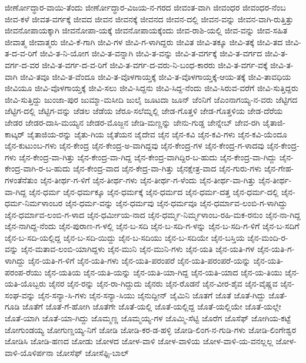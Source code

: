 ಜೀರ್ಣೋದ್ಧಾರ-ವಾಯಿ-ತೆಂದು
ಜೀರ್ಣೋದ್ಧಾರ-ವಿಜಯ-ನ-ಗರದ
ಜೀವಂತ-ವಾಗಿ
ಜೀವಂಧರ
ಜೀವಂಧರ-ನೆಂಬ
ಜೀವ-ಕಳೆ
ಜೀವತ-ವರ್ಗಕ್ಕೆ
ಜೀವದ
ಜೀವನ
ಜೀವನಕ್ಕೆ
ಜೀವನದ
ಜೀವನ-ದಲ್ಲಿ
ಜೀವನ-ವನ್ನು
ಜೀವನ-ವಾಗಿ-ರುತ್ತಿತ್ತು
ಜೀವನೋಪಾಯಕ್ಕಾಗಿ
ಜೀವನೋಪಾ-ಯಕ್ಕೆ
ಜೀವನೋಪಾಯಕ್ಕೆಂದು
ಜೀವ-ರಾಶಿ-ಯಲ್ಲಿ
ಜೀವ-ವನ್ನು
ಜೀವ-ಸಹಿತ
ಜೀವಾತ್ಮ
ಜೀವಾತ್ಮರು
ಜೀವಿ-ಕೆ-ಗಾಗಿ
ಜೀವಿ-ಗಳ
ಜೀವಿ-ಗ-ಳಾಗಿದ್ದರು
ಜೀವಿತ
ಜೀವಿ-ತಕ್ಕೂ
ಜೀವಿ-ತಕ್ಕೆ
ಜೀವಿ-ತದ
ಜೀವಿ-ತ-ದ-ವ-ರಿಗೆ
ಜೀವಿ-ತ-ನಿ-ಯೋಗ
ಜೀವಿ-ತ-ವನ್ನಾಗಿ
ಜೀವಿ-ತ-ವನ್ನು
ಜೀವಿ-ತ-ವರ್ಗಕ್ಕೆ
ಜೀವಿ-ತ-ವರ್ಗದ
ಜೀವಿ-ತ-ವರ್ಗ-ದ-ವರ
ಜೀವಿ-ತ-ವರ್ಗ-ದ-ವ-ರಿಗೆ
ಜೀವಿ-ತ-ವರ್ಗ-ದ-ವರು-ನಿ-ಬಂಧ-ಕಾರರು
ಜೀವಿ-ತ-ವರ್ಗ-ವಕ್ಕೆ
ಜೀವಿ-ತ-ವಾಗಿ
ಜೀವಿ-ತವೂ
ಜೀವಿ-ತ-ವೆಂದೂ
ಜೀವಿ-ತ-ವೊಳಗಾಯ್ತಕ್ಕೆ
ಜೀವಿ-ತ-ವೊಳಗಾಯ್ತಕ್ಕೆ-ಆಯ-ತಕ್ಕೆ
ಜೀವಿ-ತಾವಧಿಯ
ಜೀವಿಯೂ
ಜೀವಿ-ವೊಳಗಾಯ್ತಕ್ಕೆ
ಜೀವಿ-ಸಲು
ಜೀವಿ-ಸಿದ್ದನು
ಜೀವಿ-ಸಿದ್ದ-ನೆಂದು
ಜೀವಿ-ಸಿರುವ-ವರೆಗೆ
ಜೀವಿ-ಸುತ್ತಿದ್ದರು
ಜೀವಿ-ಸುತ್ತಿದ್ದು
ಜುಂಜಾ-ಪುರ
ಜುಮ್ಮಾ-ಮಸೀದಿ
ಜುಲೈ
ಜೂಟದಾ
ಜೂನ್
ಜೆಂನಿಗೆ
ಜೆಎಂನಾಗಯ್ಯ-ನ-ವರು
ಜೆಟ್ಟಿಗದ
ಜೆಟ್ಟಿಗ-ದಲ್ಲಿ
ಜೆಟ್ಟಿಗ-ವನ್ನು
ಜೆಡಲ
ಜೆಡೆಯ
ಜೆರೂ-ಸಲೆಮ್ನಲ್ಲಿ
ಜೇಡ-ಗೊತ್ತಳಿ
ಜೇಡ-ಗೊತ್ತಳಿಯ
ಜೇಡ-ದೆರೆಯ
ಜೇಡರ
ಜೇಡರ-ದಾಸಿ-ಮಯ್ಯನ
ಜೇಡರ-ಮೊಜ್ಜನ
ಜೇಡಿ-ಮಣ್ಣನ್ನು
ಜೇನು-ಗುಡ್ಡ
ಜೇನ್ನೇಬ್
ಜೇವ-ರಗಿ
ಜೈತಾಜಿ-ಕಾಟ್ಕರ್
ಜೈತಾಜಿಯ-ರನ್ನು
ಜೈತು-ಗಿಯ
ಜೈತೆಯನ
ಜೈದೇವ
ಜೈನ
ಜೈನ-ಕವಿ
ಜೈನ-ಕವಿ-ಗಳು
ಜೈನ-ಕವಿ-ಯೆಂದೂ
ಜೈನ-ಕುಟುಂಬ-ಗಳು
ಜೈನ-ಕೇಂದ್ರ
ಜೈನ-ಕೇಂದ್ರ-ಅ-ವಾಗಿದ್ದವು
ಜೈನ-ಕೇಂದ್ರ-ಗಳ
ಜೈನ-ಕೇಂದ್ರ-ಗ-ಳಾದವು
ಜೈನ-ಕೇಂದ್ರ-ಗಳು
ಜೈನ-ಕೇಂದ್ರ-ವಾ-ಗಿತ್ತು
ಜೈನ-ಕೇಂದ್ರ-ವಾ-ಗಿದ್ದ
ಜೈನ-ಕೇಂದ್ರ-ವಾಗಿದ್ದಿರ-ಬ-ಹುದು
ಜೈನ-ಕೇಂದ್ರ-ವಾ-ಗಿದ್ದು
ಜೈನ-ಕೇಂದ್ರ-ವಾಗಿ-ರ-ಬ-ಹುದು
ಜೈನ-ಕೇಂದ್ರ-ವಾದ
ಜೈನ-ಕೇದ್ರ-ವಾ-ಗಿತ್ತು
ಜೈನಕ್ಷೇತ್ರ-ವಾದ
ಜೈನ-ಗುರು-ಗಳು
ಜೈನ-ಗೇಹ-ಗಳಂತೆನೆತುಂ
ಜೈನ-ತೀರ್ಥ-ಗ-ಳಿಗೆ
ಜೈನ-ತೀರ್ಥ-ಗಳು
ಜೈನ-ತೀರ್ಥ-ಗ-ಳೆಂದು
ಜೈನ-ತೀರ್ಥ-ವಾ-ಗಿತ್ತು
ಜೈನ-ತೀರ್ಥ-ವಾ-ಗಿದ್ದ
ಜೈನ-ಧರ್ಮ
ಜೈನ-ಧರ್ಮಕ್ಕೂ
ಜೈನ-ಧರ್ಮಕ್ಕೆ
ಜೈನ-ಧರ್ಮದ
ಜೈನ-ಧರ್ಮ-ದತ್ತ
ಜೈನ-ಧರ್ಮ-ದಲ್ಲಿ
ಜೈನ-ಧರ್ಮ-ನಿರ್ಮಳಾಂಬರ
ಜೈನ-ಧರ್ಮ-ವನ್ನು
ಜೈನ-ಧರ್ಮವು
ಜೈನ-ಧರ್ಮವೂ
ಜೈನ-ಧರ್ಮಾವ-ಲಂಬಿ-ಗ-ಳಾಗಿದ್ದು
ಜೈನ-ಧರ್ಮಾವ-ಲಂಬಿ-ಗ-ಳಾದ
ಜೈನ-ಧರ್ಮೀಯ-ನಾದ
ಜೈನ-ಧರ್ಮ್ಮ-ನಿರ್ಮ್ಮಳಾಂಬ-ರಹಿ-ಮಕ-ರನುಂ
ಜೈನ-ನಾ-ಗಿದ್ದ
ಜೈನ-ನಾಗಿದ್ದ-ನೆಂದು
ಜೈನ-ಪುರಾಣ-ಗ-ಳಲ್ಲಿ
ಜೈನ-ಬ-ಸದಿ
ಜೈನ-ಬ-ಸದಿ-ಗ-ಳನ್ನು
ಜೈನ-ಬ-ಸದಿ-ಗ-ಳಿಗೆ
ಜೈನ-ಬ-ಸದಿಗೆ
ಜೈನ-ಬ-ಸದಿ-ಯಲ್ಲಿದ್ದ
ಜೈನ-ಬ-ಸದಿ-ಯಿದ್ದು
ಜೈನ-ಬ-ಸದಿಯು
ಜೈನ-ಬ-ಸದಿಯೇ
ಜೈನ-ಬಸ್ತಿಯ
ಜೈನ-ಮಂದಿ-ರ-ವನ್ನು
ಜೈನ-ಮತಾವ-ಲಂಬಿ-ಯಾಗಿದ್ದಳು
ಜೈನ-ಮುನಿ
ಜೈನ-ಮುನಿ-ಗಳು
ಜೈನ-ಯತಿ
ಜೈನ-ಯತಿ-ಗಳ
ಜೈನ-ಯತಿ-ಗ-ಳಾಗಿದ್ದು
ಜೈನ-ಯತಿ-ಗ-ಳಿಗೆ
ಜೈನ-ಯತಿ-ಗಳು
ಜೈನ-ಯತಿ-ಪರಂಪರೆ
ಜೈನ-ಯತಿ-ಪರಂಪರೆ-ಯನ್ನು
ಜೈನ-ಯತಿ-ಪರಂಪ-ರೆಯು
ಜೈನ-ಯತಿಯ
ಜೈನ-ಯತಿ-ಯನ್ನು
ಜೈನ-ಯತಿ-ಯಾ-ಗಿದ್ದ
ಜೈನ-ಯತಿ-ಯಾದ
ಜೈನ-ಯ-ತಿಯು
ಜೈನ-ಯತಿ-ಯೊಬ್ಬರು
ಜೈನರ
ಜೈನ-ರನ್ನು
ಜೈನ-ರಾ-ಗಿದ್ದುದು
ಜೈನರು
ಜೈನ-ರೊಡನೆ
ಜೈನ-ವೀರ-ಶೈವ
ಜೈನ-ವೈಷ್ಣವ
ಜೈನ-ಸಂಘ-ವನ್ನು
ಜೈನ-ಸನ್ಯಾ-ಸಿ-ಗಳು
ಜೈನ-ಸನ್ಯಾ-ಸಿಯು
ಜೈನುದ್ದೀನ್
ಜೈಮಿನಿ
ಜೊತಗೆ
ಜೊತೆ
ಜೊತೆ-ಗಿದ್ದು
ಜೊತೆ-ಗೂಡಿ
ಜೊತೆಗೆ
ಜೊತೆ-ಗೆ-ಹೋಗಿ
ಜೊತೆಗೇ
ಜೊತೆ-ಯಲ್ಲಿ
ಜೊತೆ-ಯಲ್ಲಿದ್ದ
ಜೊತೆ-ಯಲ್ಲಿಯೇ
ಜೊತೆ-ಯಲ್ಲೇ
ಜೊತೆ-ಯಾಗಿ
ಜೊತೆ-ಯಾ-ಗಿದ್ದು
ಜೊಮ್ಮಣ್ಣ
ಜೊಮ್ಮಯ್ಯ-ಗಳ
ಜೊಮ್ಮಿ-ಸೆಟ್ಟಿ
ಜೊರೆಗ
ಜೊಸೆಫ್
ಜೋಗಿಯ-ಕಟ್ಟೆ
ಜೋಗುಂಡಯ್ಯ
ಜೋಗುಣ್ಡಯ್ಯ-ನಿಗೆ
ಜೋಡಿ
ಜೋಡಿ-ಕರ-ಡ-ಹಳ್ಳಿ
ಜೋಡಿ-ಲಿಂಗ-ನ-ಗುಡಿ-ಗಳು
ಜೋಡಿ-ಲಿಂಗೇಶ್ವರ
ಜೋಡಿಸಿ
ಜೋಡಿ-ಹಣದ
ಜೋಡು
ಜೋಳದ
ಜೋಳ-ವಾಳಿ
ಜೋಳ-ವಾಳಿಯ
ಜೋಳ-ವಾಳಿ-ಯ-ವನಲ್ಲಲ್ಲ
ಜೋಳ-ವಾಳಿ-ಯೊಳಿರ್ಪನಾ
ಜೋಸೆಫ್
ಜೋಸೆಫ್ಸಿ-ಬಾಲ್
